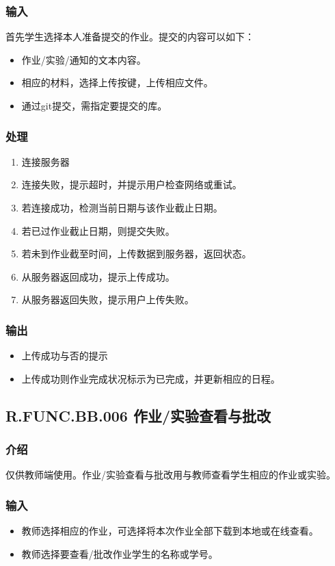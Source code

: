       \subsubsection{输入}
      首先学生选择本人准备提交的作业。提交的内容可以如下：
      \begin{itemize}
        \item 作业/实验/通知的文本内容。
        \item 相应的材料，选择上传按键，上传相应文件。
	   \item 通过git提交，需指定要提交的库。
      \end{itemize}
      \subsubsection{处理}
      \begin{enumerate}
        \item 连接服务器
        \item 连接失败，提示超时，并提示用户检查网络或重试。
        \item 若连接成功，检测当前日期与该作业截止日期。
        \item 若已过作业截止日期，则提交失败。
        \item 若未到作业截至时间，上传数据到服务器，返回状态。
        \item 从服务器返回成功，提示上传成功。
        \item 从服务器返回失败，提示用户上传失败。
      \end{enumerate}
      \subsubsection{输出}
      \begin{itemize}
        \item 上传成功与否的提示
        \item 上传成功则作业完成状况标示为已完成，并更新相应的日程。
      \end{itemize}

    \subsection{R.FUNC.BB.006 作业/实验查看与批改}
      \subsubsection{介绍}
      仅供教师端使用。作业/实验查看与批改用与教师查看学生相应的作业或实验。
      \subsubsection{输入}
      \begin{itemize}
        \item 教师选择相应的作业，可选择将本次作业全部下载到本地或在线查看。
        \item 教师选择要查看/批改作业学生的名称或学号。
      \end{itemize}
